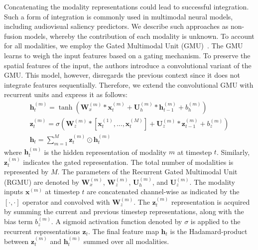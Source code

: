 \documentclass{article}
\begin{document}
Concatenating the modality representations could lead to successful integration. Such a form of integration is commonly used in multimodal neural models, including audiovisual saliency predictors. We describe such approaches as non-fusion models, whereby the contribution of each modality is unknown. To account for all modalities, we employ the Gated Multimodal Unit (GMU)~\cite{arevalo2020gated}. The GMU learns to weigh the input features based on a gating mechanism.
To preserve the spatial features of the input, the authors introduce a convolutional variant of the GMU. This model, however, disregards the previous context since it does not integrate features sequentially. 
Therefore, we extend the convolutional GMU with recurrent units and express it as follows: 
\begin{equation}
    \label{eq:rgmu}
    \begin{array}{l}
    \mathbf{h}_{t}^{(m)} = \tanh{(\mathbf{W}_x^{(m)} * \mathbf{x}_{t}^{(m)} + \mathbf{U}_h^{(m)} * \mathbf{h}_{t-1}^{(m)} + b_h^{(m)})} \\
    \mathbf{z}_{t}^{(m)} = \sigma{(\mathbf{W}_z^{(m)} * [\mathbf{x}_{t}^{(1)}, ..., \mathbf{x}_{t}^{(M)}] + \mathbf{U}_z^{(m)} * \mathbf{z}_{t-1}^{(m)} + b_z^{(m)})} \\
    \mathbf{h}_{t} = \sum_{m=1}^{M} \mathbf{z}_t^{(m)} \odot \mathbf{h}_t^{(m)}
    \end{array}
\end{equation}
where $\mathbf{h}_{t}^{(m)}$ is the hidden representation of modality $m$ at timestep $t$. Similarly, $\mathbf{z}_{t}^{(m)}$ indicates the gated representation. The total number of modalities is represented by $M$. The parameters of the Recurrent Gated Multimodal Unit (RGMU) are denoted by $\mathbf{W}_x^{(m)}$, $\mathbf{W}_z^{(m)}$, $\mathbf{U}_h^{(m)}$, and $\mathbf{U}_z^{(m)}$. The modality inputs $\mathbf{x}^{(m)}$ at timestep $t$ are concatenated channel-wise as indicated by the $[\mathbf{\cdot}{,}\mathbf{\cdot}]$ operator and convolved with $\mathbf{W}_z^{(m)}$. The $\mathbf{z}_t^{(m)}$ representation is acquired by summing the current and previous timestep representations, along with the bias term $b_z^{(m)}$. A sigmoid activation function denoted by $\sigma$ is applied to the recurrent representations $\mathbf{z}_t$. The final feature map $\mathbf{h}_t$ is the Hadamard-product between $\mathbf{z}_t^{(m)}$ and $\mathbf{h}_t^{(m)}$ summed over all modalities. 
\end{document}
